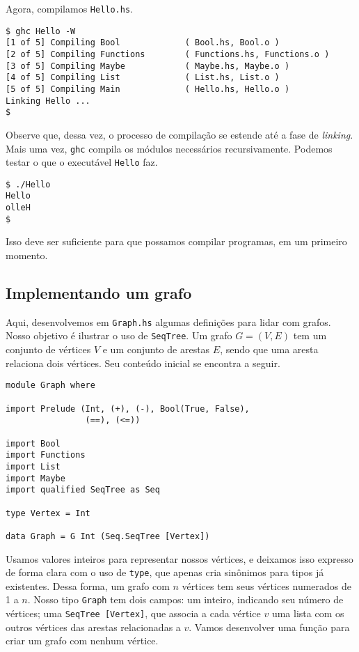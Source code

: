 \documentclass[a4paper]{article}
\begin{document}
Agora, compilamos \texttt{Hello.hs}.

\begin{verbatim}
$ ghc Hello -W
[1 of 5] Compiling Bool             ( Bool.hs, Bool.o )
[2 of 5] Compiling Functions        ( Functions.hs, Functions.o )
[3 of 5] Compiling Maybe            ( Maybe.hs, Maybe.o )
[4 of 5] Compiling List             ( List.hs, List.o )
[5 of 5] Compiling Main             ( Hello.hs, Hello.o )
Linking Hello ...
$
\end{verbatim}

Observe que, dessa vez, o processo de compilação se estende até a fase de \emph{linking}.
Mais uma vez, \texttt{ghc} compila os módulos necessários recursivamente.
Podemos testar o que o executável \texttt{Hello} faz.

\begin{verbatim}
$ ./Hello
Hello
olleH
$
\end{verbatim}

Isso deve ser suficiente para que possamos compilar programas, em um primeiro momento.

\subsection{Implementando um grafo}

Aqui, desenvolvemos em \texttt{Graph.hs} algumas definições para lidar com grafos.
Nosso objetivo é ilustrar o uso de \texttt{SeqTree}.
Um grafo \mbox{$G = (V, E)$} tem um conjunto de vértices $V$ e um conjunto de arestas $E$, sendo que uma aresta relaciona dois vértices.
Seu conteúdo inicial se encontra a seguir.

\pagebreak

\begin{verbatim}
module Graph where

import Prelude (Int, (+), (-), Bool(True, False),
                (==), (<=))

import Bool
import Functions
import List
import Maybe
import qualified SeqTree as Seq

type Vertex = Int

data Graph = G Int (Seq.SeqTree [Vertex])
\end{verbatim}

Usamos valores inteiros para representar nossos vértices, e deixamos isso expresso de forma clara com o uso de \texttt{type}, que apenas cria sinônimos para tipos já existentes.
Dessa forma, um grafo com $n$ vértices tem seus vértices numerados de 1 a $n$.
Nosso tipo \texttt{Graph} tem dois campos: um inteiro, indicando seu número de vértices; uma \texttt{SeqTree [Vertex]}, que associa a cada vértice $v$ uma lista com os outros vértices das arestas relacionadas a $v$.
Vamos desenvolver uma função para criar um grafo com nenhum vértice.
\end{document}
